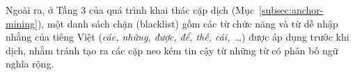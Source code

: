 Ngoài ra, ở Tầng 3 của quá trình khai thác cặp dịch (Mục~\ref{subsec:anchor-mining}),
một danh sách chặn (blacklist) gồm các từ chức năng và từ dễ nhập nhằng của tiếng Việt
(\textit{các, những, được, để, thế, cái,~\ldots}) được áp dụng trước khi dịch, nhằm
tránh tạo ra các cặp neo kém tin cậy từ những từ có phân bố ngữ nghĩa rộng.
